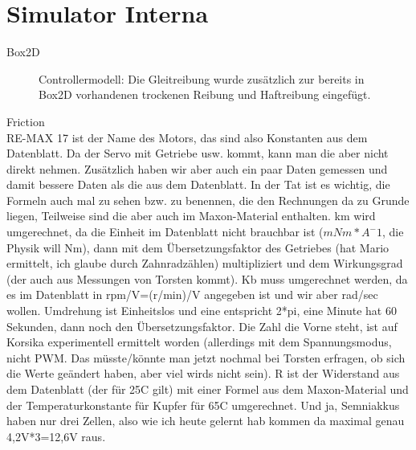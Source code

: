\documentclass[10pt,a4paper]{article}
\begin{document}
\section{Simulator Interna}

Box2D\\

\begin{figure}[H]
    \centering
    
    \caption{Controllermodell: Die Gleitreibung wurde zusätzlich zur bereits in Box2D vorhandenen trockenen Reibung und Haftreibung eingefügt.}
    \label{fig:controllermodell}
\end{figure}

Friction\\

RE-MAX 17 ist der Name des Motors, das sind also Konstanten aus dem Datenblatt.
Da der Servo mit Getriebe usw. kommt, kann man die aber nicht direkt nehmen.
Zusätzlich haben wir aber auch ein paar Daten gemessen und damit bessere Daten als die aus dem Datenblatt. In der Tat ist es wichtig, die Formeln auch mal zu sehen bzw. zu benennen, die den Rechnungen da zu Grunde liegen, Teilweise sind die aber auch im Maxon-Material enthalten.
km wird umgerechnet, da die Einheit im Datenblatt nicht brauchbar ist ($mNm*A^-1$, die Physik will Nm), dann mit dem Übersetzungsfaktor des Getriebes (hat Mario ermittelt, ich glaube durch Zahnradzählen) multipliziert und dem Wirkungsgrad (der auch aus Messungen von Torsten kommt).
Kb muss umgerechnet werden, da es im Datenblatt in rpm/V=(r/min)/V angegeben ist und wir aber rad/sec wollen. Umdrehung ist Einheitslos und eine entspricht 2*pi, eine Minute hat 60 Sekunden, dann noch den Übersetzungsfaktor. Die Zahl die Vorne steht, ist auf Korsika experimentell ermittelt worden (allerdings mit dem Spannungsmodus, nicht PWM. Das müsste/könnte man jetzt nochmal bei Torsten erfragen, ob sich die Werte geändert haben, aber viel wirds nicht sein).
R ist der Widerstand aus dem Datenblatt (der für 25C gilt) mit einer Formel aus dem Maxon-Material und der Temperaturkonstante für Kupfer für 65C umgerechnet. 
Und ja, Semniakkus haben nur drei Zellen, also wie ich heute gelernt hab kommen da maximal genau 4,2V*3=12,6V raus.
\end{document}
